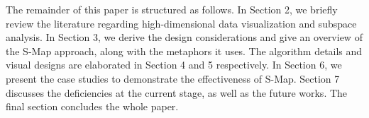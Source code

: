 The remainder of this paper is structured as follows. In Section 2, we briefly review the literature regarding high-dimensional data visualization and subspace analysis. In Section 3, we derive the design considerations and give an overview of the S-Map approach, along with the metaphors it uses. The algorithm details and visual designs are elaborated in Section 4 and 5 respectively. In Section 6, we present the case studies to demonstrate the effectiveness of S-Map. Section 7 discusses the deficiencies at the current stage, as well as the future works. The final section concludes the whole paper.